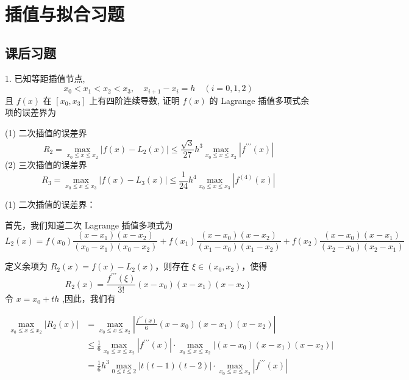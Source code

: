 \section{插值与拟合习题}
\subsection{课后习题}
\begin{tcolorbox}[breakable,enhanced,arc=0mm,outer arc=0mm,
		boxrule=0pt,toprule=1pt,leftrule=0pt,bottomrule=1pt, rightrule=0pt,left=0.2cm,right=0.2cm,
		titlerule=0.5em,toptitle=0.1cm,bottomtitle=-0.1cm,top=0.2cm,
		colframe=white!10!biru,colback=white!90!biru,coltitle=white,
            coltext=black,title =2024-03-10, title style={white!10!biru}, before skip=8pt, after skip=8pt,before upper=\hspace{2em},
		fonttitle=\bfseries,fontupper=\normalsize]
  
1. 已知等距插值节点,
$$
x_{0}<x_{1}<x_{2}<x_{3}, \quad x_{i+1}-x_{i}=h \quad({i}=0,1,2)
$$
且 $ f(x) $ 在 $ \left[x_{0}, x_{3}\right] $ 上有四阶连续导数, 证明 $ f(x) $ 的 Lagrange 插值多项式余项的误差界为

(1) 二次插值的误差界
$$
R_{2}=\max _{x_{0} \leq x \leq x_{2}}\left|f(x)-L_{2}(x)\right| \leq \frac{\sqrt{3}}{27} h^{3} \max _{x_{0} \leq x \leq x_{2}}\left|f^{\prime \prime \prime}(x)\right|
$$
(2) 三次插值的误差界
$$
R_{3}=\max _{x_{0} \leq x \leq x_{3}}\left|f(x)-L_{3}(x)\right| \leq \frac{1}{24} h^{4} \max _{x_{0} \leq x \leq x_{3}}\left|f^{(4)}(x)\right|
$$
 \tcblower

(1) 二次插值的误差界：

首先，我们知道二次 Lagrange 插值多项式为
$$
L_{2}(x)=f\left(x_{0}\right) \frac{(x-x_{1})(x-x_{2})}{(x_{0}-x_{1})(x_{0}-x_{2})}+f\left(x_{1}\right) \frac{(x-x_{0})(x-x_{2})}{(x_{1}-x_{0})(x_{1}-x_{2})}+f\left(x_{2}\right) \frac{(x-x_{0})(x-x_{1})}{(x_{2}-x_{0})(x_{2}-x_{1})}
$$

定义余项为 $ R_2(x)=f(x)-L_{2}(x) $，则存在 $ \xi \in(x_{0}, x_{2}) $，使得
$$
R_2(x)=\frac{f^{\prime \prime \prime}(\xi)}{3 !}(x-x_{0})(x-x_{1})(x-x_{2})
$$
令 $ x=x_{0}+t h $ ,因此，我们有


$$
\begin{aligned}
\max _{x_{0} \leqslant x \leqslant x_{2}} |R_2(x)| &=\max _{x_{0} \leqslant x \leqslant x_{2}}\left|\frac{f^{\prime \prime \prime}(x)}{6}(x-x_{0})(x-x_{1})(x-x_{2})\right| \\
&\leqslant \frac{1}{6} \max _{x_{0} \leqslant x \leqslant x_{2}}\left|f^{\prime \prime \prime}(x)\right| \cdot \max _{x_{0} \leqslant x \leqslant x_{2}}\left|\left(x-x_{0}\right)\left(x-x_{1}\right)\left(x-x_{2}\right)\right| \\
&=\frac{1}{6} h^{3} \max _{0 \leqslant t \leqslant 2}|t(t-1)(t-2)| \cdot \max _{x_{0} \leqslant x \leqslant x_{2}}\left|f^{\prime \prime \prime}(x)\right| \\
\end{aligned}
$$


\end{tcolorbox}
